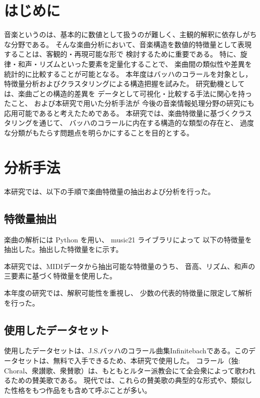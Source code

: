 \section{はじめに}

音楽というのは、基本的に数値として扱うのが難しく、主観的解釈に依存しがちな分野である。
そんな楽曲分析において、音楽構造を数値的特徴量として表現することは、客観的・再現可能な形で
検討するために重要である。
特に、旋律・和声・リズムといった要素を定量化することで、
楽曲間の類似性や差異を統計的に比較することが可能となる。
本年度はバッハのコラールを対象とし，
特徴量分析およびクラスタリングによる構造把握を試みた。
研究動機としては、楽曲ごとの構造的差異を
データとして可視化・比較する手法に関心を持ったこと、
および本研究で用いた分析手法が
今後の音楽情報処理分野の研究にも応用可能であると考えたためである。
本研究では、楽曲特徴量に基づくクラスタリングを通じて、
バッハのコラールに内在する構造的な類型の存在と、
過度な分類がもたらす問題点を明らかにすることを目的とする。



\section{分析手法}
本研究では、以下の手順で楽曲特徴量の抽出および分析を行った。
\subsection{特徴量抽出}
楽曲の解析には Python を用い、
music21 ライブラリによって
以下の特徴量を抽出した。抽出した特徴量をに示す。



本研究では、MIDIデータから抽出可能な特徴量のうち、
音高、リズム、和声の三要素に基づく特徴量を使用した。

本年度の研究では、解釈可能性を重視し、
少数の代表的特徴量に限定して解析を行った。

\subsection{使用したデータセット}
使用したデータセットは、J.S.バッハのコラール曲集Infinitebach\cite{Infinitebach}である。このデータセットは、無料で入手できるため、本研究で使用した。
コラール（独: Choral、衆讃歌、衆賛歌）は、もともとルター派教会にて全会衆によって歌われるための賛美歌である。
現代では、これらの賛美歌の典型的な形式や、類似した性格をもつ作品をも含めて呼ぶことが多い。\cite{Koraru}


